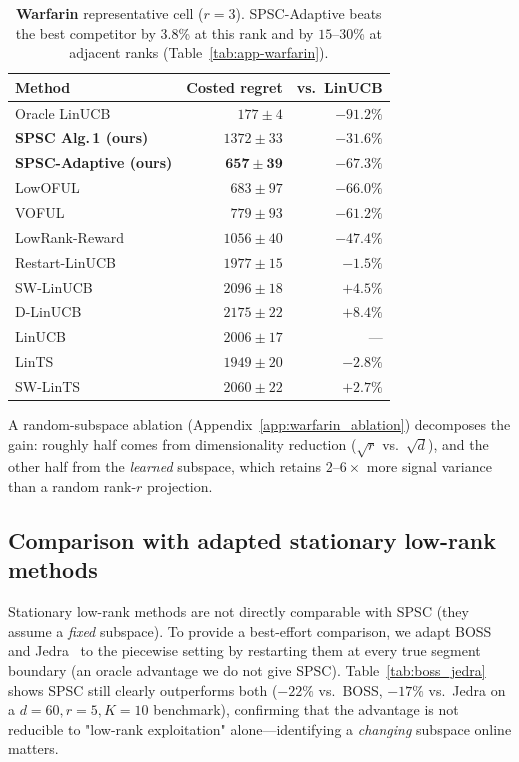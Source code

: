 \documentclass{article}
\begin{document}
\begin{table}[!htbp]
\centering
\caption{\textbf{Warfarin} representative cell ($r{=}3$).
SPSC-Adaptive beats the best competitor by $3.8$\% at this rank and
by $15$--$30$\% at adjacent ranks (Table~\ref{tab:app-warfarin}).}
\label{tab:warfarin_body}
\small
\begin{tabular}{lrr}
\toprule
Method & Costed regret & vs.\ LinUCB \\
\midrule
Oracle LinUCB                           & $177 \pm 4$    & $-91.2\%$\\
\textbf{SPSC Alg.\,1 (ours)}            & $1372 \pm 33$  & $-31.6\%$\\
\textbf{SPSC-Adaptive (ours)}           & $\mathbf{657 \pm 39}$   & $\mathbf{-67.3\%}$\\
LowOFUL~\citep{jun2019bilinear}         & $683 \pm 97$   & $-66.0\%$\\
VOFUL~\citep{kim2022improved}           & $779 \pm 93$   & $-61.2\%$\\
LowRank-Reward                          & $1056 \pm 40$  & $-47.4\%$\\
Restart-LinUCB                          & $1977 \pm 15$  & $-1.5\%$\\
SW-LinUCB~\citep{cheung2019learning}    & $2096 \pm 18$  & $+4.5\%$\\
D-LinUCB~\citep{russac2019weighted}     & $2175 \pm 22$  & $+8.4\%$\\
LinUCB~\citep{abbasi2011improved}       & $2006 \pm 17$  & ---\\
LinTS~\citep{agrawal2013thompson}       & $1949 \pm 20$  & $-2.8\%$\\
SW-LinTS                                & $2060 \pm 22$  & $+2.7\%$\\
\bottomrule
\end{tabular}
\end{table}

A random-subspace ablation (Appendix~\ref{app:warfarin_ablation})
decomposes the gain: roughly half comes from dimensionality reduction
($\sqrt{r}$ vs.\ $\sqrt{d}$), and the other half from the
\emph{learned} subspace, which retains $2$--$6\times$ more signal
variance than a random rank-$r$ projection.

\subsection{Comparison with adapted stationary low-rank methods}
\label{sec:exp_boss_jedra}

Stationary low-rank methods are not directly comparable with
SPSC (they assume a \emph{fixed} subspace). To provide a best-effort
comparison, we adapt BOSS and Jedra~\citep{pmlr-v235-jedra24a}
to the piecewise setting by restarting them at every true segment
boundary (an oracle advantage we do not give SPSC).
Table~\ref{tab:boss_jedra} shows SPSC still clearly outperforms
both ($-22\%$ vs.\ BOSS, $-17\%$ vs.\ Jedra on a $d{=}60, r{=}5,
K{=}10$ benchmark), confirming that the advantage is not reducible
to "low-rank exploitation" alone---identifying a \emph{changing}
subspace online matters.
\end{document}
